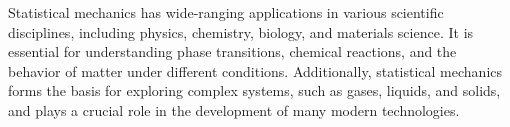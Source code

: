 Statistical mechanics has wide-ranging applications in various scientific disciplines, including physics, chemistry, biology, and materials science. It is essential for understanding phase transitions, chemical reactions, and the behavior of matter under different conditions. Additionally, statistical mechanics forms the basis for exploring complex systems, such as gases, liquids, and solids, and plays a crucial role in the development of many modern technologies.




